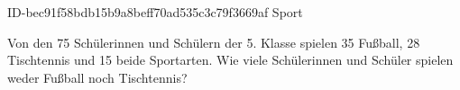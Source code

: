\begin{exercise}
      {ID-bec91f58bdb15b9a8beff70ad535c3c79f3669af}
      {Sport}
  \ifproblem\problem\par
    Von den 75 Schülerinnen und Schülern der 5. Klasse spielen 35 Fußball,
    28 Tischtennis und 15 beide Sportarten. Wie viele Schülerinnen und Schüler
    spielen weder Fußball noch Tischtennis?
  \fi
\end{exercise}
